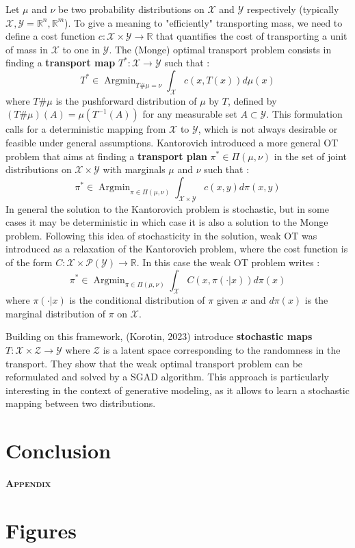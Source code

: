 \documentclass[11pt]{article}
\newcommand{\R}{\mathbb{R}}
\DeclareMathOperator*{\Argmin}{\text{Argmin}}
\begin{document}
Let $\mu$ and $\nu$ be two probability distributions on $\mathcal{X}$ and $\mathcal{Y}$ respectively (typically $\mathcal{X}, \mathcal{Y}=\R^n,\R^m$). To give a meaning to "efficiently" transporting mass, we need to define a cost function $c:\mathcal{X}\times\mathcal{Y}\to\R$ that quantifies the cost of transporting a unit of mass in $\mathcal{X}$ to one in $\mathcal{Y}$. The (Monge) optimal transport problem consists in finding a \textbf{transport map} $T^*:\mathcal{X}\to \mathcal{Y}$ such that :
\begin{equation}
    T^* \in \Argmin_{T\#\mu=\nu} \int_{\mathcal{X}} c(x,T(x))d\mu(x)
\end{equation}
where $T\#\mu$ is the pushforward distribution of $\mu$ by $T$, defined by $(T\#\mu)(A)=\mu(T^{-1}(A))$ for any measurable set $A\subset\mathcal{Y}$. This formulation calls for a deterministic mapping from $\mathcal{X}$ to $\mathcal{Y}$, which is not always desirable or feasible under general assumptions. Kantorovich introduced  a more general OT problem that aims at finding a \textbf{transport plan} $\pi^*\in \Pi(\mu,\nu)$ in the set of joint distributions on $\mathcal{X}\times\mathcal{Y}$ with marginals $\mu$ and $\nu$ such that :
\begin{equation}
    \pi^* \in \Argmin_{\pi\in\Pi(\mu,\nu)} \int_{\mathcal{X}\times\mathcal{Y}} c(x,y)d\pi(x,y)
\end{equation}
In general the solution to the Kantorovich problem is stochastic, but in some cases it may be deterministic in which case it is also a solution to the Monge problem. Following this idea of stochasticity in the solution, weak OT was introduced as a relaxation of the Kantorovich problem, where the cost function is of the form $C: \mathcal{X}\times \mathcal{P}(\mathcal{Y})\to\R$. In this case the weak OT problem writes :
\begin{equation}
    \pi^* \in \Argmin_{\pi\in\Pi(\mu,\nu)} \int_{\mathcal{X}} C(x,\pi(\cdot|x))d\pi(x)
\end{equation}
where $\pi(\cdot|x)$ is the conditional distribution of $\pi$ given $x$ and $d\pi(x)$ is the marginal distribution of $\pi$ on $\mathcal{X}$.

Building on this framework, (Korotin, 2023) \cite{korotin-2022} introduce \textbf{stochastic maps} $T:\mathcal{X}\times \mathcal{Z}\to \mathcal{Y}$ where $\mathcal{Z}$ is a latent space corresponding to the randomness in the transport. They show that the weak optimal transport problem can be reformulated and solved by a SGAD algorithm. This approach is particularly interesting in the context of generative modeling, as it allows to learn a stochastic mapping between two distributions.

\section{Conclusion}

\newpage


\newpage
\appendix

\begin{center}
    {\Large \bfseries \scshape Appendix} \\
\end{center}

\section{Figures}
\end{document}
